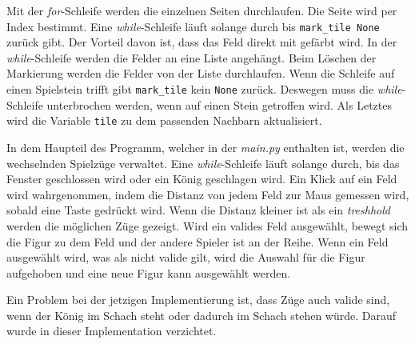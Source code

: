 Mit der \textit{for}-Schleife werden die einzelnen Seiten durchlaufen. Die Seite wird per Index bestimmt. Eine \textit{while}-Schleife läuft solange durch bis \texttt{mark\_tile None} zurück gibt. Der Vorteil davon ist, dass das Feld direkt mit gefärbt wird. In der \textit{while}-Schleife werden die Felder an eine Liste angehängt. Beim Löschen der Markierung werden die Felder von der Liste durchlaufen. Wenn die Schleife auf einen Spielstein trifft gibt \texttt{mark\_tile} kein \texttt{None} zurück. Deswegen muss die \textit{while}-Schleife unterbrochen werden, wenn auf einen Stein getroffen wird. Als Letztes wird die Variable \texttt{tile} zu dem passenden Nachbarn aktualisiert.\par
In dem Haupteil des Programm, welcher in der \textit{main.py}  enthalten ist, werden die wechselnden Spielzüge verwaltet. Eine \textit{while}-Schleife läuft solange durch, bis das Fenster geschlossen wird oder ein König geschlagen wird. Ein Klick auf ein Feld wird wahrgenommen, indem die Distanz von jedem Feld zur Maus gemessen wird, sobald eine Taste gedrückt wird. Wenn die Distanz kleiner ist als ein \textit{treshhold} werden die möglichen Züge gezeigt. Wird ein valides Feld ausgewählt, bewegt sich die Figur zu dem Feld und der andere Spieler ist an der Reihe. Wenn ein Feld ausgewählt wird, was als nicht valide gilt, wird die Auswahl für die Figur aufgehoben und eine neue Figur kann ausgewählt werden.\par
Ein Problem bei der jetzigen Implementierung ist, dass Züge auch valide sind, wenn der König im Schach steht oder dadurch im Schach stehen würde. Darauf wurde in dieser Implementation verzichtet.
